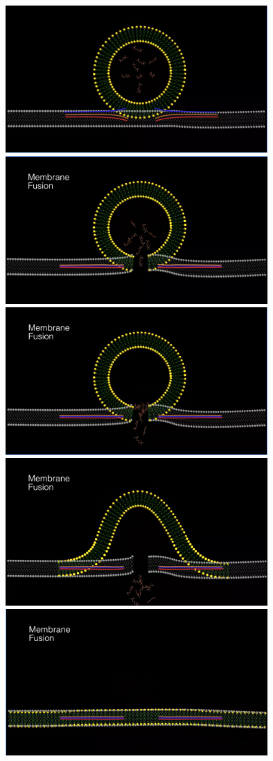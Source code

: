 \documentclass[12pt, a4paper]{article}
\begin{document}
{
    \centering
    \includegraphics[width=10cm]{membrane_fusion1.png}
    \includegraphics[width=10cm]{membrane_fusion2.png}
    \includegraphics[width=10cm]{membrane_fusion3.png}
    \includegraphics[width=10cm]{membrane_fusion4.png}
    \includegraphics[width=10cm]{membrane_fusion5.png}

}
\end{document}
